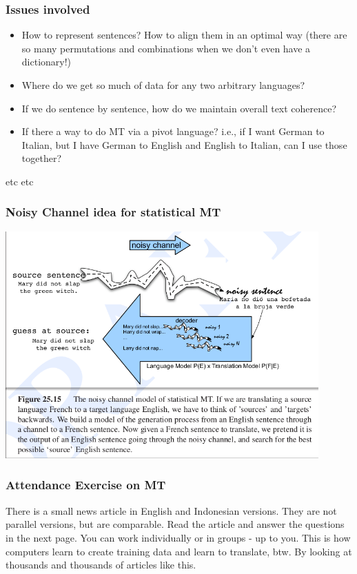 \documentclass{beamer}
\begin{document}
\begin{frame}
\frametitle{Issues involved}
\begin{itemize}
\item How to represent sentences? How to align them in an optimal way (there are so many permutations and combinations when we don't even have a dictionary!)
\item Where do we get so much of data for any two arbitrary languages?
\item If we do sentence by sentence, how do we maintain overall text coherence?
\item If there a way to do MT via a pivot language? i.e., if I want German to Italian, but I have German to English and English to Italian, can I use those together? 
\end{itemize}
etc etc
\end{frame}

\begin{frame}
\frametitle{Noisy Channel idea for statistical MT}
\includegraphics[width=0.9\textwidth]{noisychannel.png}
\end{frame}

\begin{frame}
\frametitle{Attendance Exercise on MT}
 There is a small news article in English and Indonesian versions.  They are not parallel versions, but are comparable.  Read the article and answer the questions in
the next page. You can work individually or in groups - up to you. This is how computers learn to create training data and learn to translate, btw. By looking at thousands and thousands of articles like this.
\end{frame}
\end{document}
